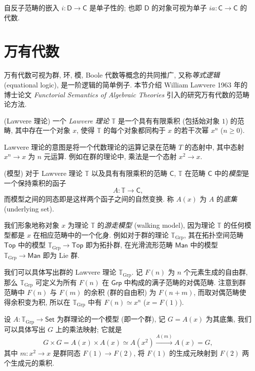 \begin{example}
	{}
	自反子范畴的嵌入 $i\colon \mathsf D\to\mathsf C$ 是单子性的; 也即 $\mathsf D$ 的对象可视为单子 $ia\colon \mathsf C\to\mathsf C$ 的代数.
\end{example}



\section{万有代数}

\label{universal-algebra}

万有代数可视为群, 环, 模, Boole 代数等概念的共同推广, 又称\emph{等式逻辑} (equational logic), 是一阶逻辑的简单例子. 本节介绍 William Lawvere 1963 年的博士论文 \emph{Functorial Semantics of Algebraic Theories} 引入的研究万有代数的范畴论方法.

\begin{definition}
	{(Lawvere 理论)}
	一个 \emph{Lawvere 理论} $\mathbb T$ 是一个具有有限乘积 (包括始对象 $1$) 的范畴,
	其中存在一个对象 $x$, 使得 $\mathbb T$ 的每个对象都同构于 $x$ 的若干次幂 $x^n$ ($n\geq 0$).
\end{definition}

Lawvere 理论的意图是将一个代数理论的运算记录在范畴 $T$ 的态射中, 其中态射 $x^n \to x$ 为 $n$ 元运算. 例如在群的理论中, 乘法是一个态射 $x^2 \to x$.


\begin{definition}
	{(模型)}
	对于 Lawvere 理论 $\mathbb T$ 以及具有有限乘积的范畴 $\mathsf C$, $\mathbb T$ 在范畴 $\mathsf C$ 中的\emph{模型}是一个保持乘积的函子
	$$
	A \colon \mathbb T \to \mathsf {C},
	$$
	而模型之间的同态即是这样两个函子之间的自然变换.
	称 $A(x)$ 为 $A$ 的\emph{底集} (underlying set).
\end{definition}

我们形象地称对象 $x$ 为理论 $\mathbb T$ 的\emph{游走模型} (walking model), 因为理论 $\mathbb T$ 的任何模型都是 $x$ 在相应范畴中的一个化身.
例如对于群的理论 $\mathbb T_{\text{Grp}}$, 其在拓扑空间范畴 $\mathsf {Top}$ 中的模型 $\mathbb T_{\text{Grp}} \to \mathsf {Top}$ 即为拓扑群,
在光滑流形范畴 $\mathsf {Man}$ 中的模型 $\mathbb T_{\text{Grp}} \to \mathsf {Man}$ 即为 Lie 群.

我们可以具体写出群的 Lawvere 理论 $\mathbb T_{\text{Grp}}$. 记 $F(n)$ 为 $n$ 个元素生成的自由群,
那么 $\mathbb T_{\text{Grp}}$ 可定义为所有 $F(n)$ 在 $\mathsf {Grp}$ 中构成的满子范畴的对偶范畴. 注意到群范畴中 $F(n)$ 与 $F(m)$ 的余积 (群的自由积) 为 $F(n+m)$,
而取对偶范畴使得余积变为积, 所以在 $\mathbb T_{\text{Grp}}$ 中有 $F(n) \simeq x^n$ ($x=F(1)$).

设 $A \colon \mathbb T_{\text{Grp}} \to \mathsf {Set}$ 为群理论的一个模型 (即一个群), 记 $G=A(x)$ 为其底集, 我们可以具体写出 $G$ 上的乘法映射;
它就是
$$
G\times G = A(x) \times A(x) \simeq A(x^2) \overset{A(m)}{\longrightarrow} A(x) = G,
$$
其中 $m \colon x^2 \to x$ 是群同态 $F(1) \to F(2)$, 将 $F(1)$ 的生成元映射到 $F(2)$ 两个生成元的乘积.
